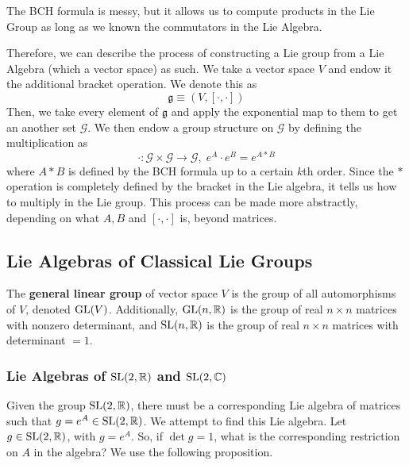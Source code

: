   The BCH formula is messy, but it allows us to compute products in the Lie Group as long as we known the commutators in the Lie Algebra. 

  Therefore, we can describe the process of constructing a Lie group from a Lie Algebra (which a vector space) as such. We take a vector space $V$ and endow it the additional bracket operation. We denote this as
  \begin{equation}
    \mathfrak{g} \equiv (V, [\cdot, \cdot])
  \end{equation}
  Then, we take every element of $\mathfrak{g}$ and apply the exponential map to them to get an another set $\mathcal{G}$. We then endow a group structure on $\mathcal{G}$ by defining the multiplication as 
  \begin{equation}
    \cdot: \mathcal{G} \times \mathcal{G} \rightarrow \mathcal{G}, \; e^A \cdot e^B = e^{A * B}
  \end{equation}
  where $A*B$ is defined by the BCH formula up to a certain $k$th order. Since the $*$ operation is completely defined by the bracket in the Lie algebra, it tells us how to multiply in the Lie group. This process can be made more abstractly, depending on what $A, B$ and $[\cdot,\cdot]$ is, beyond matrices. 

\subsection{Lie Algebras of Classical Lie Groups}

  \begin{definition}
    The \textbf{general linear group} of vector space $V$ is the group of all automorphisms of $V$, denoted $\GL(V)$. Additionally, $\GL(n, \mathbb{R})$ is the group of real $n \times n$ matrices with nonzero determinant, and $\SL(n, \mathbb{R})$ is the group of real $n \times n$ matrices with determinant $= 1$.
  \end{definition}

  \subsubsection[Lie Algebras of SL(2, R) and SL(2, C)]{Lie Algebras of $\SL(2, \mathbb{R})$ and $\SL(2, \mathbb{C})$}

    Given the group $\SL(2, \mathbb{R})$, there must be a corresponding Lie algebra of matrices such that $g = e^A \in \SL(2, \mathbb{R})$. We attempt to find this Lie algebra. Let $g \in \SL(2, \mathbb{R})$, with $g = e^A$. So, if $\det{g} = 1$, what is the corresponding restriction on $A$ in the algebra? We use the following proposition. 

